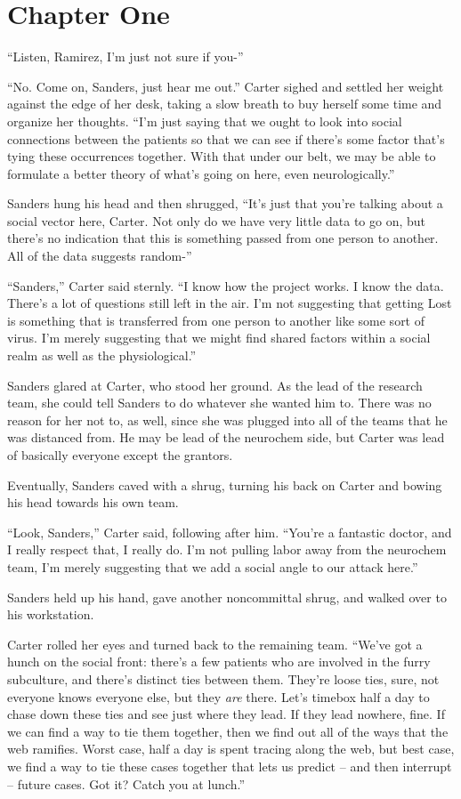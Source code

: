 \chapter*{Chapter One}

``Listen, Ramirez, I'm just not sure if you-''

``No.  Come on, Sanders, just hear me out.''  Carter sighed and settled her weight against the edge of her desk, taking a slow breath to buy herself some time and organize her thoughts.  ``I'm just saying that we ought to look into social connections between the patients so that we can see if there's some factor that's tying these occurrences together.  With that under our belt, we may be able to formulate a better theory of what's going on here, even neurologically.''

Sanders hung his head and then shrugged, ``It's just that you're talking about a social vector here, Carter.  Not only do we have very little data to go on, but there's no indication that this is something passed from one person to another.  All of the data suggests random-''

``Sanders,'' Carter said sternly.  ``I know how the project works.  I know the data.  There's a lot of questions still left in the air.  I'm not suggesting that getting Lost is something that is transferred from one person to another like some sort of virus.  I'm merely suggesting that we might find shared factors within a social realm as well as the physiological.''

Sanders glared at Carter, who stood her ground.  As the lead of the research team, she could tell Sanders to do whatever she wanted him to.  There was no reason for her not to, as well, since she was plugged into all of the teams that he was distanced from.  He may be lead of the neurochem side, but Carter was lead of basically everyone except the grantors.

Eventually, Sanders caved with a shrug, turning his back on Carter and bowing his head towards his own team.

``Look, Sanders,'' Carter said, following after him.  ``You're a fantastic doctor, and I really respect that, I really do.  I'm not pulling labor away from the neurochem team, I'm merely suggesting that we add a social angle to our attack here.''

Sanders held up his hand, gave another noncommittal shrug, and walked over to his workstation.

Carter rolled her eyes and turned back to the remaining team.  ``We've got a hunch on the social front: there's a few patients who are involved in the furry subculture, and there's distinct ties between them.  They're loose ties, sure, not everyone knows everyone else, but they \textit{are} there.  Let's timebox half a day to chase down these ties and see just where they lead.  If they lead nowhere, fine.  If we can find a way to tie them together, then we find out all of the ways that the web ramifies.  Worst case, half a day is spent tracing along the web, but best case, we find a way to tie these cases together that lets us predict -- and then interrupt -- future cases.  Got it?  Catch you at lunch.''

